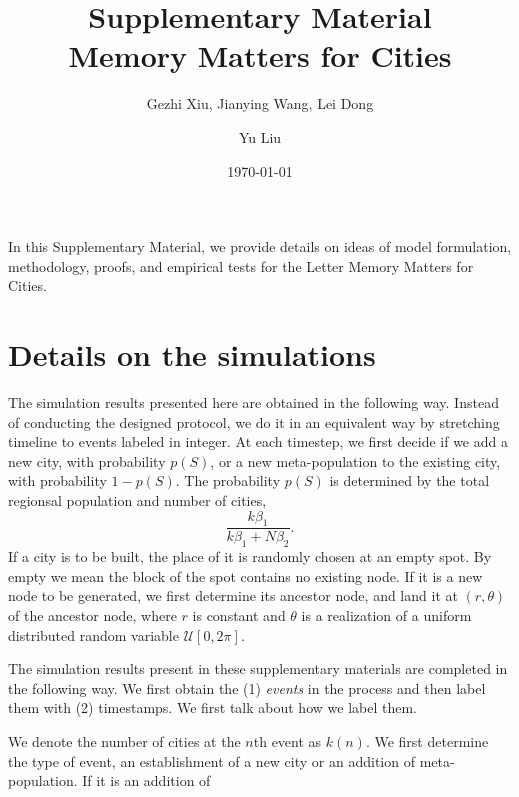 \documentclass[aps,prl]{revtex4-2}
\begin{document}
\title{Supplementary Material\\Memory Matters for Cities}
\date{\today}
\author{Gezhi Xiu, Jianying Wang, Lei Dong}

\author{Yu Liu}

\pacs{} 



\maketitle
\tableofcontents
\vspace{1cm}

In this Supplementary Material, we provide details on ideas of model formulation, methodology, proofs, and empirical tests for the Letter Memory Matters for Cities.
\section{Details on the simulations}

The simulation results presented here are obtained in the following way. Instead of conducting the designed protocol, we do it in an equivalent way by stretching timeline to events labeled in integer. At each timestep, we first decide if we add a new city, with probability $p(S)$, or a new meta-population to the existing city, with probability $1-p(S)$. The probability $p(S)$ is determined by the total regionsal population and number of cities, $$\frac{k\beta_1}{k\beta_1+N\beta_2}.$$ If a city is to be built, the place of it is randomly chosen at an empty spot. By empty we mean the block of the spot contains no existing node. If it is a new node to be generated, we first determine its ancestor node, and land it at $(r,\theta)$ of the ancestor node, where $r$ is constant and $\theta$ is a realization of a uniform distributed random variable $\mathcal{U}[0,2\pi]$. 

The simulation results present in these supplementary materials are completed in the following way. We first obtain the (1) \emph{events} in the process and then label them with (2) timestamps. We first talk about how we label them. 

We denote the number of cities at the $n$th event as $k(n)$. We first determine the type of event, an establishment of a new city or an addition of meta-population. If it is an addition of 
\end{document}
